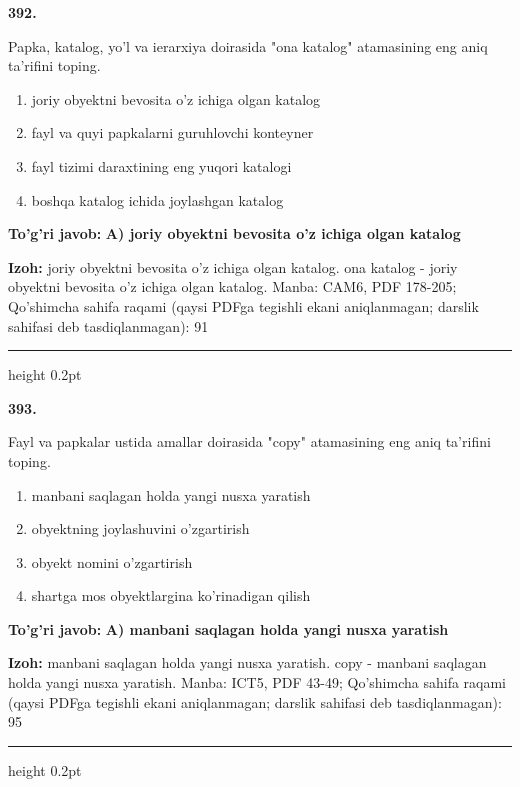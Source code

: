 \documentclass[10pt,a4paper]{article}
\begin{document}
{\bfseries\sffamily\color{ink} 392.}
\par
Papka, katalog, yo'l va ierarxiya doirasida "ona katalog" atamasining eng aniq ta'rifini toping.
\begin{enumerate}[label=\Alph*),leftmargin=9mm]
\item joriy obyektni bevosita o'z ichiga olgan katalog
\item fayl va quyi papkalarni guruhlovchi konteyner
\item fayl tizimi daraxtining eng yuqori katalogi
\item boshqa katalog ichida joylashgan katalog
\end{enumerate}
\begin{tcolorbox}[enhanced,breakable,colback=teal!4,colframe=teal!60!black,boxrule=0.45pt,arc=1.2mm,left=2.7mm,right=2.7mm,top=1.8mm,bottom=1.8mm,before skip=2mm,after skip=2mm]
{\bfseries\sffamily\color{teal}To'g'ri javob:} \textbf{A) joriy obyektni bevosita o'z ichiga olgan katalog}
\par\smallskip
{\bfseries Izoh:} joriy obyektni bevosita o'z ichiga olgan katalog. ona katalog - joriy obyektni bevosita o'z ichiga olgan katalog. Manba: CAM6, PDF 178-205; Qo'shimcha sahifa raqami (qaysi PDFga tegishli ekani aniqlanmagan; darslik sahifasi deb tasdiqlanmagan): 91
\end{tcolorbox}
\vspace{2mm}\hrule height 0.2pt\vspace{3mm}

{\bfseries\sffamily\color{ink} 393.}
\par
Fayl va papkalar ustida amallar doirasida "copy" atamasining eng aniq ta'rifini toping.
\begin{enumerate}[label=\Alph*),leftmargin=9mm]
\item manbani saqlagan holda yangi nusxa yaratish
\item obyektning joylashuvini o'zgartirish
\item obyekt nomini o'zgartirish
\item shartga mos obyektlargina ko'rinadigan qilish
\end{enumerate}
\begin{tcolorbox}[enhanced,breakable,colback=teal!4,colframe=teal!60!black,boxrule=0.45pt,arc=1.2mm,left=2.7mm,right=2.7mm,top=1.8mm,bottom=1.8mm,before skip=2mm,after skip=2mm]
{\bfseries\sffamily\color{teal}To'g'ri javob:} \textbf{A) manbani saqlagan holda yangi nusxa yaratish}
\par\smallskip
{\bfseries Izoh:} manbani saqlagan holda yangi nusxa yaratish. copy - manbani saqlagan holda yangi nusxa yaratish. Manba: ICT5, PDF 43-49; Qo'shimcha sahifa raqami (qaysi PDFga tegishli ekani aniqlanmagan; darslik sahifasi deb tasdiqlanmagan): 95
\end{tcolorbox}
\vspace{2mm}\hrule height 0.2pt\vspace{3mm}
\end{document}
